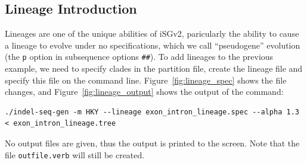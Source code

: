 \documentclass[10pt]{article}
\begin{document}
 \subsection{Lineage Introduction}
 Lineages are one of the unique abilities of iSGv2, paricularly the ability to cause a lineage to evolve under no specifications, which we call ``pseudogene'' evolution (the {\tt p} option in subsequence options {\tt \#\#}). To add lineages to the previous example, we need to specify clades in the partition file, create the lineage file and specify this file on the command line. Figure~\ref{fig:lineage_spec} shows the file changes, and Figure~\ref{fig:lineage_output} shows the output of the command:
 
 \begin{verbatim}
./indel-seq-gen -m HKY --lineage exon_intron_lineage.spec --alpha 1.3 < exon_intron_lineage.tree
 \end{verbatim}

 No output files are given, thus the output is printed to the screen. Note that the file {\tt outfile.verb} will still be created. 
\end{document}

